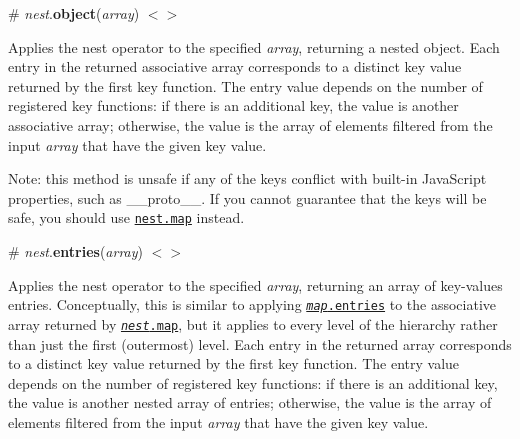 \label{_nest_object}%
\# {\itshape nest}.{\bfseries object}({\itshape array}) \href{https://github.com/d3/d3-collection/blob/master/src/nest.js#L49}{\tt $<$$>$}

Applies the nest operator to the specified {\itshape array}, returning a nested object. Each entry in the returned associative array corresponds to a distinct key value returned by the first key function. The entry value depends on the number of registered key functions\+: if there is an additional key, the value is another associative array; otherwise, the value is the array of elements filtered from the input {\itshape array} that have the given key value.

Note\+: this method is unsafe if any of the keys conflict with built-\/in Java\+Script properties, such as {\ttfamily \+\_\+\+\_\+proto\+\_\+\+\_\+}. If you cannot guarantee that the keys will be safe, you should use \href{#nest_map}{\tt nest.\+map} instead.

\label{_nest_entries}%
\# {\itshape nest}.{\bfseries entries}({\itshape array}) \href{https://github.com/d3/d3-collection/blob/master/src/nest.js#L51}{\tt $<$$>$}

Applies the nest operator to the specified {\itshape array}, returning an array of key-\/values entries. Conceptually, this is similar to applying \href{#map_entries}{\tt {\itshape map}.entries} to the associative array returned by \href{#nest_map}{\tt {\itshape nest}.map}, but it applies to every level of the hierarchy rather than just the first (outermost) level. Each entry in the returned array corresponds to a distinct key value returned by the first key function. The entry value depends on the number of registered key functions\+: if there is an additional key, the value is another nested array of entries; otherwise, the value is the array of elements filtered from the input {\itshape array} that have the given key value. 